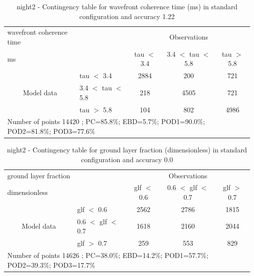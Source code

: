 \begin{table}[p!]
\begin{center}
\begin{tabular}{llccc}
\hline
{wavefront coherence time}                                       &                                                    & \multicolumn{3}{c}{Observations}                 \\
{ms}                                       &                             & tau $<$ 3.4   & 3.4 $<$ tau $<$ 5.8 & tau $>$ 5.8 \\
\hline
\multicolumn{1}{c}{\multirow{3}{*}{Model data}}  & tau $<$ 3.4             & 2884                & 200                       & 721              \\
                                                 & 3.4  $<$ tau $<$ 5.8 & 218                & 4505                       & 721              \\
                                                 & tau $>$ 5.8             & 104                & 802                       & 4986              \\
\hline
\multicolumn{5}{l}{ Number of points        14420 ; PC=85.8\%; EBD=5.7\%; POD1=90.0\%; POD2=81.8\%; POD3=77.6\%}
\end{tabular}
\end{center}
\caption{night2 - Contingency table for  wavefront coherence time (ms) in standard configuration and accuracy 1.22}
\label{tab:contingencytauBEF:night2}
\end{table}
\clearpage
\begin{table}[p!]
\begin{center}
\begin{tabular}{llccc}
\hline
{ground layer fraction}                                       &                                                    & \multicolumn{3}{c}{Observations}                 \\
{dimensionless}                                       &                             & glf $<$ 0.6   & 0.6 $<$ glf $<$ 0.7 & glf $>$ 0.7 \\
\hline
\multicolumn{1}{c}{\multirow{3}{*}{Model data}}  & glf $<$ 0.6             & 2562                & 2786                       & 1815              \\
                                                 & 0.6  $<$ glf $<$ 0.7 & 1618                & 2160                       & 2044              \\
                                                 & glf $>$ 0.7             & 259                & 553                       & 829              \\
\hline
\multicolumn{5}{l}{ Number of points        14626 ; PC=38.0\%; EBD=14.2\%; POD1=57.7\%; POD2=39.3\%; POD3=17.7\%}
\end{tabular}
\end{center}
\caption{night2 - Contingency table for  ground layer fraction (dimensionless) in standard configuration and accuracy 0.0}
\label{tab:contingencyglfBEF:night2}
\end{table}

